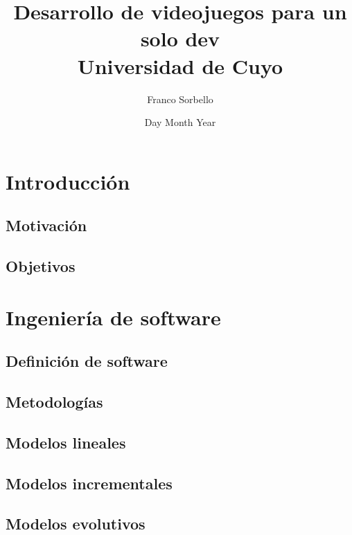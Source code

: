 \documentclass[12pt]{report}
\title{
    {Desarrollo de videojuegos para un solo dev}\\
    {\large Universidad de Cuyo}\\
}
\author{Franco Sorbello}
\date{Day Month Year}
\begin{document}
\maketitle
\tableofcontents
% 
%
\chapter{Introducción}

\section{Motivación}


\section{Objetivos}


% 
%
\chapter{Ingeniería de software}

\section{Definición de software}


\section{Metodologías} 


\section{Modelos lineales}


\section{Modelos incrementales}


\section{Modelos evolutivos}
\label{sec:modelos_evolutivos}

\end{document}
